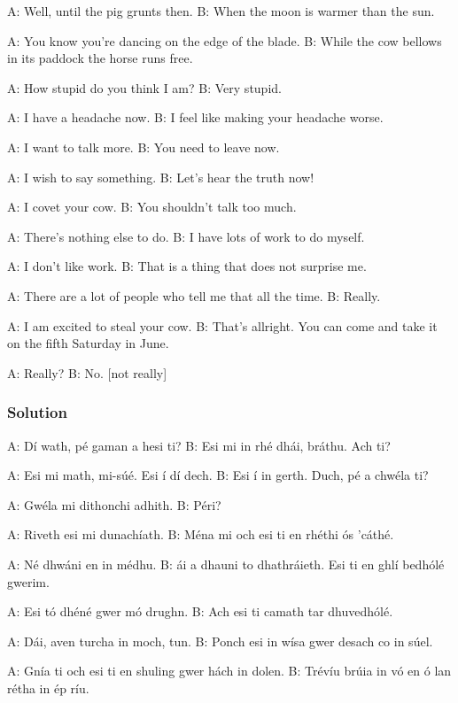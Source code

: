A: Well, until the pig grunts then.
B: When the moon is warmer than the sun.

A: You know you're dancing on the edge of the blade.
B: While the cow bellows in its paddock the horse runs free.

A: How stupid do you think I am?
B: Very stupid.

A: I have a headache now.
B: I feel like making your headache worse.

A: I want to talk more.
B: You need to leave now.

A: I wish to say something.
B: Let's hear the truth now!

A: I covet your cow.
B: You shouldn't talk too much.

A: There's nothing else to do.
B: I have lots of work to do myself.

A: I don't like work.
B: That is a thing that does not surprise me.

A: There are a lot of people who tell me that all the time.
B: Really.

A: I am excited to steal your cow.
B: That's allright. You can come and take it on the fifth Saturday in June.

A: Really?
B: No. [not really]

\newpage
\subsubsection{Solution}

A: D\'{i} wath, p\'{e} gaman a hesi ti?
B: Esi mi in rh\'{e} dh\'{a}i, br\'{a}thu. Ach ti?

A: Esi mi math, mi-s\'{u}\'{e}. Esi \'{i} d\'{i} dech.
B: Esi \'{i} in gerth. Duch, p\'{e} a chw\'{e}la ti?

A: Gw\'{e}la mi dithonchi adhith.
B: P\'{e}ri?

A: Riveth esi mi dunach\'{i}ath.
B: M\'{e}na mi och esi ti en rh\'{e}thi \'{o}s 'c\'{a}th\'{e}.

A: N\'{e} dhw\'{a}ni en in m\'{e}dhu.
B: \'{a}i a dhauni to dhathr\'{a}ieth. Esi ti en ghl\'{i} bedh\'{o}l\'{e} gwerim.

A: Esi t\'{o} dh\'{e}n\'{e} gwer m\'{o} drughn.
B: Ach esi ti camath tar dhuvedh\'{o}l\'{e}.

A: D\'{a}i, aven turcha in moch, tun.
B: Ponch esi in w\'{i}sa gwer desach co in s\'{u}el.

A: Gn\'{i}a ti och esi ti en shuling gwer h\'{a}ch in dolen.
B: Tr\'{e}v\'{i}u br\'{u}ia in v\'{o} en \'{o} lan r\'{e}tha in \'{e}p r\'{i}u.

